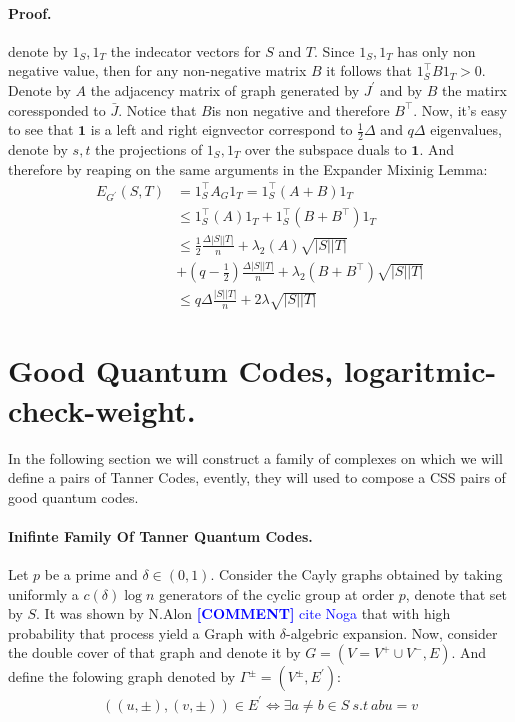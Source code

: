 \documentclass{article}
\newcommand{\commentt}[1]{\textcolor{blue}{ \textbf{[COMMENT]} #1}}
\newcommand{\ctt}[1]{\commentt{#1}}
\begin{document}
\begin{multicols*}{2}
  \paragraph{Proof.} denote by $1_{S}, 1_{T}$ the indecator vectors for $S$ and $T$. Since $1_{S},1_{T}$ has only non negative value, then for any non-negative matrix $B$ it follows that $1_{S}^{\top}B 1_{T} > 0$. Denote by $A$ the adjacency matrix of graph generated by $J^{\prime}$  and by $B$ the matirx coressponded to $\bar{J}$. Notice that $B$is non negative and therefore $B^{\top}$. Now, it's easy to see that $\mathbf{1}$ is a left and right eignvector  correspond to $\frac{1}{2}\Delta$ and $q\Delta$ eigenvalues, denote by $s,t$ the projections of $1_{S}, 1_{T}$ over the subspace duals to $\mathbf{1}$. And therefore by reaping on the same arguments in the Expander Mixinig Lemma: 
  \begin{equation*}
    \begin{split}
      E_{G^{\prime}}\left( S,T \right) & = 1_{S}^{\top}A_{G}1_{T} = 1_{S}^{\top} \left( A + B  \right) 1_{T} \\ & \le  1_{S}^{\top}\left( A  \right)1_{T} +  1_{S}^{\top}\left( B + B^{\top} \right)1_{T}   \\
      & \le \frac{1}{2} \frac{\Delta|S||T|}{n} + \lambda_{2}\left( A \right)\sqrt{|S||T|} \\ 
      & + \left( q - \frac{1}{2} \right) \frac{\Delta|S||T|}{n} + \lambda_{2}\left( B + B^{\top} \right)\sqrt{|S||T|} \\ 
      & \le q\Delta \frac{|S||T|}{n} + 2\lambda\sqrt{|S||T|}
    \end{split}
  \end{equation*}

    \section{Good Quantum Codes, logaritmic-check-weight.} 
In the following section we will construct a family of complexes on which we will define a pairs of Tanner Codes, evently, they will used to compose a CSS pairs of good quantum codes.  
  \paragraph{Inifinte Family Of Tanner Quantum Codes.} 
  Let $p$ be a prime and $\delta \in \left( 0,1 \right)$. Consider the Cayly graphs obtained by taking uniformly a $c\left( \delta \right)\log n$ generators of the cyclic group at order $p$, denote that set by $S$. It was shown by N.Alon \ctt{cite Noga} that with high probability that process yield a Graph with $\delta$-algebric expansion. Now, consider the double cover of that graph and denote it by $G = \left( V = V^{+} \cup V^{-},E \right)$. And define the folowing graph denoted by $\Gamma^{\pm} = \left(V^{\pm}, E^{\prime}\right)$:
  \begin{equation*}
    \begin{split}
      \left( \left(u , \pm  \right), \left( v, \pm \right) \right) \in  E^{\prime} \Leftrightarrow \exists a\neq b \in S \ s.t \ abu = v     
    \end{split}
  \end{equation*}
     


\end{multicols*}
\end{document}
